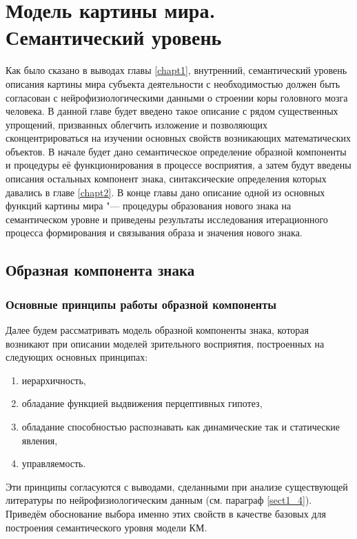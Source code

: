 \chapter{Модель картины мира. Семантический уровень} \label{chapt3}

Как было сказано в выводах главы \ref{chapt1}, внутренний, семантический уровень описания картины мира субъекта деятельности с необходимостью должен быть согласован с нейрофизиологическими данными о строении коры головного мозга человека. В данной главе будет введено такое описание с рядом существенных упрощений, призванных облегчить изложение и позволяющих сконцентрироваться на изучении основных свойств возникающих математических объектов. В начале будет дано семантическое определение образной компоненты и процедуры её функционирования в процессе восприятия, а затем будут введены описания остальных компонент знака, синтаксические определения которых давались в главе \ref{chapt2}. В конце главы дано описание одной из основных функций картины мира "--- процедуры образования нового знака на семантическом уровне и приведены результаты исследования итерационного процесса формирования и связывания образа и значения нового знака.

\section{Образная компонента знака}\label{sect3_1}

\subsection{Основные принципы работы образной компоненты} \label{subsect3_1_1}

Далее будем рассматривать модель образной компоненты знака, которая возникают при описании моделей зрительного восприятия, построенных на следующих основных принципах:
\begin{enumerate}
	\item иерархичность,
	\item обладание функцией выдвижения перцептивных гипотез,
	\item обладание способностью распознавать как динамические так и статические явления,
	\item управляемость.
\end{enumerate}

Эти принципы согласуются с выводами, сделанными при анализе существующей литературы по нейрофизиологическим данным (см. параграф \ref{sect1_4}). Приведём обоснование выбора именно этих свойств в качестве базовых для построения семантического уровня модели КМ.

